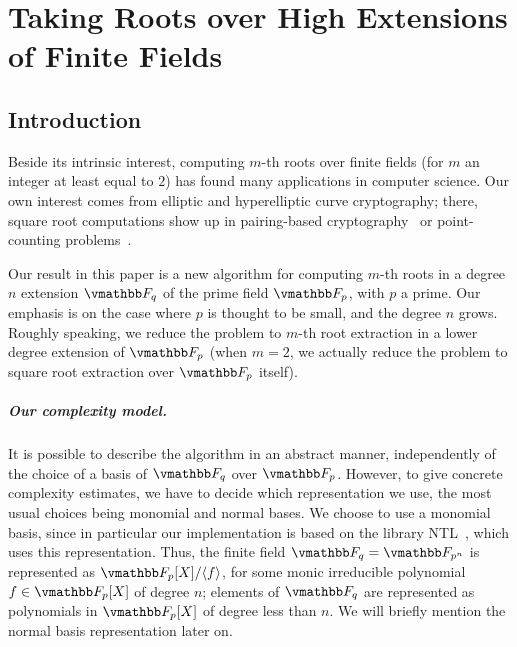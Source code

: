 \graphicspath{{roots_high_ext/}}

\chapter{Taking Roots over High Extensions of Finite Fields}
\label{chapter:high-ext-roots}

\section{Introduction}\label{section:intro}

Beside its intrinsic interest, computing $m$-th roots over finite
fields (for $m$ an integer at least equal to $2$) has found many
applications in computer science. Our own interest comes from elliptic
and hyperelliptic curve cryptography; there, square root computations
show up in pairing-based cryptography~\cite{BaKiLySc02} or
point-counting problems~\cite{GaSc10}.


Our result in this paper is a new algorithm for computing $m$-th roots
in a degree $n$ extension $\F_q$ of the prime field $\F_p$, with $p$ a
prime. Our emphasis is on the case where $p$ is thought to be small,
and the degree $n$ grows. Roughly speaking, we reduce the problem to
$m$-th root extraction in a lower degree extension of $\F_p$ (when
$m=2$, we actually reduce the problem to square root extraction over
$\F_p$ itself).


\paragraph{Our complexity model.}
It is possible to describe the algorithm in an abstract manner,
independently of the choice of a basis of $\F_q$ over $\F_p$. However,
to give concrete complexity estimates, we have to decide which
representation we use, the most usual choices being monomial and
normal bases. We choose to use a monomial basis, since in particular
our implementation is based on the library NTL~\cite{NTL2009}, which
uses this representation.  Thus, the finite field $\F_q=\F_{p^n}$ is
represented as $\F_p[X]/\langle f\rangle$, for some monic irreducible
polynomial $f \in \F_p[X]$ of degree $n$; elements of $\F_q$ are
represented as polynomials in $\F_p[X]$ of degree less than $n$. We
will briefly mention the normal basis representation later on.

